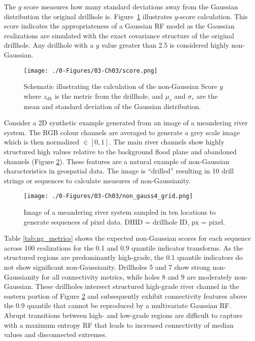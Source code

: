 The $y$ score measures how many standard deviations away from the Gaussian distribution the original drillhole is. Figure~\ref{fig:score} illustrates $y$-score calculation. This score indicates the appropriateness of a Gaussian \gls{RF} model as the Gaussian realizations are simulated with the exact covariance structure of the original drillhole. Any drillhole with a $y$ value greater than 2.5 is considered highly non-Gaussian.

\begin{figure}[htb!]
    \centering
    \texttt{[image: ./0-Figures/03-Ch03/score.png]}
    \caption{Schematic illustrating the calculation of the non-Gaussian Score $y$ where $z_{dh}$ is the metric from the drillhole, and $\mu_{r}$ and $\sigma_{r}$ are the mean and standard deviation of the Gaussian distribution.}
    \label{fig:score}
\end{figure}

Consider a \gls{2D} synthetic example generated from an image of a meandering river system. The RGB colour channels are averaged to generate a grey scale image which is then normalized $\in [0,1]$. The main river channels show highly structured high values relative to the background flood plane and abandoned channels (Figure \ref{fig:non_gauss4_grid}). These features are a natural example of non-Gaussian characteristics in geospatial data. The image is ``drilled'' resulting in 10 drill strings or sequences to calculate measures of non-Gaussianity.

\begin{figure}[htb!]
    \centering
    \texttt{[image: ./0-Figures/03-Ch03/non\_gauss4\_grid.png]}
    \caption{Image of a meandering river system sampled in ten locations to generate sequences of pixel data. DHID = drillhole ID, px = pixel. }
    \label{fig:non_gauss4_grid}
\end{figure}

Table \ref{tab:ng_metrics} shows the expected non-Gaussian scores for each sequence across 100 realizations for the 0.1 and 0.9 quantile indicator transforms. As the structured regions are predominantly high-grade, the 0.1 quantile indicators do not show significant non-Gaussianity. Drillholes 5 and 7 show strong non-Gaussianity for all connectivity metrics, while holes 8 and 9 are moderately non-Gaussian. These drillholes intersect structured high-grade river channel in the eastern portion of Figure \ref{fig:non_gauss4_grid} and subsequently exhibit connectivity features above the 0.9 quantile that cannot be reproduced by a multivariate Gaussian \gls{RF}. Abrupt transitions between high- and low-grade regions are difficult to capture with a maximum entropy \gls{RF} that leads to increased connectivity of median values and disconnected extremes.

